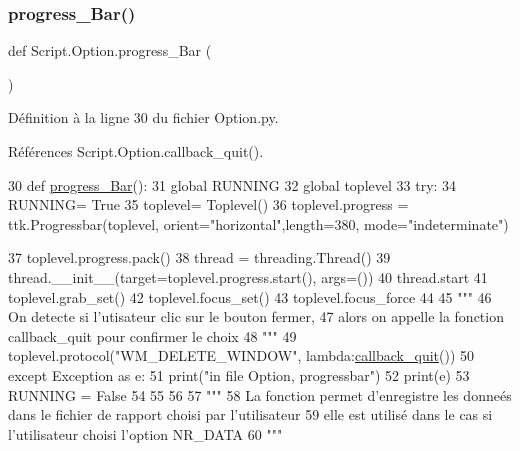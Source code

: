 \subsubsection{\texorpdfstring{progress\+\_\+\+Bar()}{progress\_Bar()}}
{\footnotesize\ttfamily def Script.\+Option.\+progress\+\_\+\+Bar (\begin{DoxyParamCaption}{ }\end{DoxyParamCaption})}



Définition à la ligne 30 du fichier Option.\+py.



Références Script.\+Option.\+callback\+\_\+quit().


\begin{DoxyCode}
30 \textcolor{keyword}{def }\hyperlink{namespaceScript_1_1Option_aff91639f98fde0463987ea08e565da05}{progress\_Bar}():
31     \textcolor{keyword}{global} RUNNING
32     \textcolor{keyword}{global} toplevel
33     \textcolor{keywordflow}{try}:
34         RUNNING= \textcolor{keyword}{True}
35         toplevel= Toplevel()
36         toplevel.progress = ttk.Progressbar(toplevel, orient=\textcolor{stringliteral}{"horizontal"},length=380, mode=\textcolor{stringliteral}{"indeterminate"})
      
37         toplevel.progress.pack()
38         thread = threading.Thread()
39         thread.\_\_init\_\_(target=toplevel.progress.start(), args=())
40         thread.start
41         toplevel.grab\_set()
42         toplevel.focus\_set()
43         toplevel.focus\_force
44 
45         \textcolor{stringliteral}{"""
}
46 \textcolor{stringliteral}{        On detecte si l'utisateur clic sur le bouton fermer,
}
47 \textcolor{stringliteral}{        alors on appelle la fonction callback\_quit pour confirmer le choix 
}
48 \textcolor{stringliteral}{        """}
49         toplevel.protocol(\textcolor{stringliteral}{"WM\_DELETE\_WINDOW"}, \textcolor{keyword}{lambda}:\hyperlink{namespaceScript_1_1Option_abb674ebac6565861fc8240a9306f8ecd}{callback\_quit}())
50     \textcolor{keywordflow}{except} Exception \textcolor{keyword}{as} e:
51         print(\textcolor{stringliteral}{"in file Option, progressbar"})
52         print(e)
53         RUNNING = \textcolor{keyword}{False}
54     
55 
56 
57 \textcolor{stringliteral}{"""
}
58 \textcolor{stringliteral}{La fonction permet d'enregistre les donneés dans le fichier de rapport choisi par l'utilisateur 
}
59 \textcolor{stringliteral}{elle est utilisé dans le cas si l'utilisateur choisi l'option NR\_DATA
}
60 \textcolor{stringliteral}{"""}
\end{DoxyCode}
